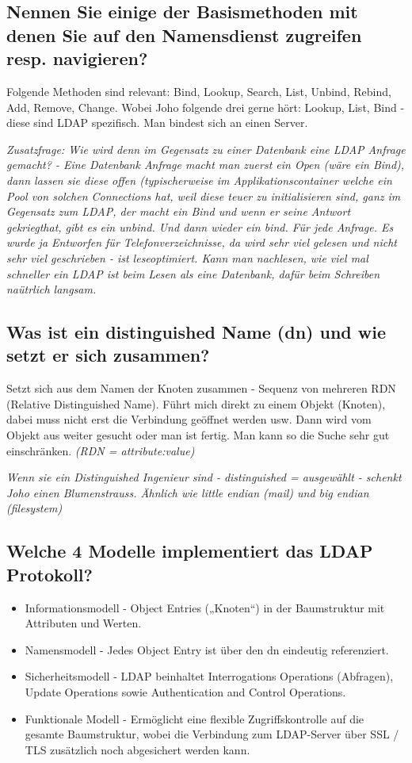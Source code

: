 \subsection{Nennen Sie einige der Basismethoden mit denen Sie auf den Namensdienst zugreifen resp. navigieren?}
Folgende Methoden sind relevant: Bind, Lookup, Search, List, Unbind, Rebind, Add, Remove, Change. Wobei Joho folgende drei gerne hört: Lookup, List, Bind - diese sind LDAP spezifisch. Man bindest sich an einen Server.

\emph{Zusatzfrage: Wie wird denn im Gegensatz zu einer Datenbank eine LDAP Anfrage gemacht? - Eine Datenbank Anfrage macht man zuerst ein Open (wäre ein Bind), dann lassen sie diese offen (typischerweise im Applikationscontainer welche ein Pool von solchen Connections hat, weil diese teuer zu initialisieren sind, ganz im Gegensatz zum LDAP, der macht ein Bind und wenn er seine Antwort gekriegthat, gibt es ein unbind. Und dann wieder ein bind. Für jede Anfrage. Es wurde ja Entworfen für Telefonverzeichnisse, da wird sehr viel gelesen und nicht sehr viel geschrieben - ist leseoptimiert. Kann man nachlesen, wie viel mal schneller ein LDAP ist beim Lesen als eine Datenbank, dafür beim Schreiben naütrlich langsam.}

\subsection{Was ist ein distinguished Name (dn) und wie setzt er sich zusammen?}
Setzt sich aus dem Namen der Knoten zusammen - Sequenz von mehreren RDN (Relative Distinguished Name). Führt mich direkt zu einem Objekt (Knoten), dabei muss nicht erst die Verbindung geöffnet werden usw. Dann wird vom Objekt aus weiter gesucht oder man ist fertig. Man kann so die Suche sehr gut einschränken. \emph{(RDN = attribute:value)}

\emph{Wenn sie ein Distinguished Ingenieur sind - distinguished = ausgewählt - schenkt Joho einen Blumenstrauss. Ähnlich wie little endian (mail) und big endian (filesystem)}

\subsection{Welche 4 Modelle implementiert das LDAP Protokoll?}
\begin{itemize}
	\item Informationsmodell - Object Entries („Knoten“) in der Baumstruktur mit Attributen und Werten.
	\item Namensmodell - Jedes Object Entry ist über den dn eindeutig referenziert.
	\item Sicherheitsmodell - LDAP beinhaltet Interrogations Operations (Abfragen), Update Operations sowie Authentication and Control Operations.
	\item Funktionale Modell - Ermöglicht eine flexible Zugriffskontrolle auf die gesamte Baumstruktur, wobei die	Verbindung zum LDAP-Server über SSL / TLS zusätzlich noch abgesichert werden kann.
\end{itemize}

